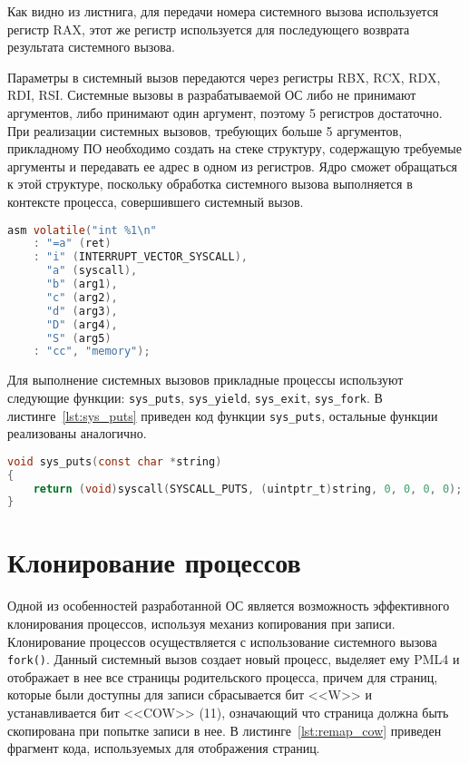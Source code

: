 Как видно из листнига, для передачи номера
системного вызова используется регистр RAX, этот же регистр используется
для последующего возврата результата системного вызова.

Параметры в системный вызов передаются через регистры RBX, RCX, RDX, RDI, RSI.
Системные вызовы в разрабатываемой ОС либо не принимают аргументов, либо принимают один
аргумент, поэтому 5 регистров достаточно. При реализации системных вызовов,
требующих больше 5 аргументов, прикладному ПО необходимо создать на стеке
структуру, содержащую требуемые аргументы и передавать ее адрес в одном из регистров.
Ядро сможет обращаться к этой структуре, поскольку обработка системного вызова
выполняется в контексте процесса, совершившего системный вызов.

\begin{lstlisting}[language=C,
caption={Выполнение системных вызовов},
label={lst:syscall}]
asm volatile("int %1\n"
	: "=a" (ret)
	: "i" (INTERRUPT_VECTOR_SYSCALL),
	  "a" (syscall),
	  "b" (arg1),
	  "c" (arg2),
	  "d" (arg3),
	  "D" (arg4),
	  "S" (arg5)
	: "cc", "memory");
\end{lstlisting}

Для выполнение системных вызовов прикладные процессы используют следующие функции:
\texttt{sys\_puts}, \texttt{sys\_yield}, \texttt{sys\_exit}, \texttt{sys\_fork}. В
листинге~\ref{lst:sys_puts} приведен код функции \texttt{sys\_puts}, остальные функции
реализованы аналогично.

\begin{lstlisting}[language=C, caption={Реализация функции \texttt{sys\_puts}}, label={lst:sys_puts}]
void sys_puts(const char *string)
{
	return (void)syscall(SYSCALL_PUTS, (uintptr_t)string, 0, 0, 0, 0);
}
\end{lstlisting}


\section{Клонирование процессов}
Одной из особенностей разработанной ОС является возможность эффективного клонирования
процессов, используя механиз копирования при записи. Клонирование процессов
осуществляется с использование системного вызова \texttt{fork()}. Данный системный
вызов создает новый процесс, выделяет ему PML4 и отображает в нее все страницы
родительского процесса, причем для страниц, которые были доступны для записи сбрасывается
бит <<W>> и устанавливается бит <<COW>> (11), означающий что страница должна быть
скопирована при попытке записи в нее. В листинге~\ref{lst:remap_cow} приведен фрагмент кода,
используемых для отображения страниц.

